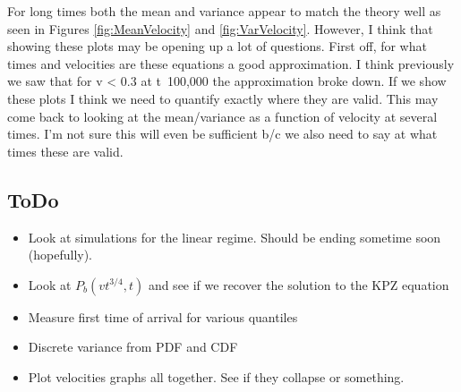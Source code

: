 \documentclass{article}
\begin{document}
\indent For long times both the mean and variance appear to match the theory well as seen in Figures \ref{fig:MeanVelocity} and \ref {fig:VarVelocity}. However, I think that showing these plots may be opening up a lot of questions. First off, for what times and velocities are these equations a good approximation. I think previously we saw that for v < 0.3 at t~100,000 the approximation broke down. If we show these plots I think we need to quantify exactly where they are valid. This may come back to looking at the mean/variance as a function of velocity at several times. I'm not sure this will even be sufficient b/c we also need to say at what times these are valid.

\subsection{ToDo}

\begin{itemize} 
	\item Look at simulations for the linear regime. Should be ending sometime soon (hopefully). 
	\item Look at $P_{b}(vt^{3/4}, t)$ and see if we recover the solution to the KPZ equation
	\item Measure first time of arrival for various quantiles
	\item Discrete variance from PDF and CDF
	\item Plot velocities graphs all together. See if they collapse or something. 
\end{itemize}
\end{document}
